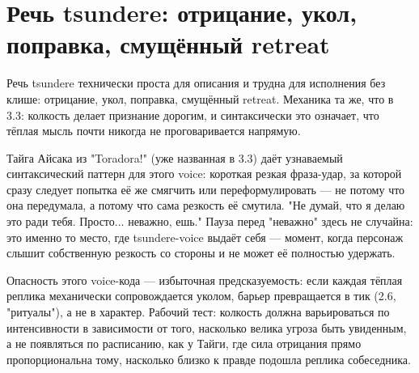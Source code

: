\section{Речь tsundere: отрицание, укол, поправка, смущённый retreat}

Речь tsundere технически проста для описания и трудна для исполнения без клише: отрицание, укол, поправка, смущённый retreat. Механика та же, что в 3.3: колкость делает признание дорогим, и синтаксически это означает, что тёплая мысль почти никогда не проговаривается напрямую.

Тайга Айсака из "Toradora!" (уже названная в 3.3) даёт узнаваемый синтаксический паттерн для этого voice: короткая резкая фраза-удар, за которой сразу следует попытка её же смягчить или переформулировать — не потому что она передумала, а потому что сама резкость её смутила. "Не думай, что я делаю это ради тебя. Просто... неважно, ешь." Пауза перед "неважно" здесь не случайна: это именно то место, где tsundere-voice выдаёт себя — момент, когда персонаж слышит собственную резкость со стороны и не может её полностью удержать.

Опасность этого voice-кода — избыточная предсказуемость: если каждая тёплая реплика механически сопровождается уколом, барьер превращается в тик (2.6, "ритуалы"), а не в характер. Рабочий тест: колкость должна варьироваться по интенсивности в зависимости от того, насколько велика угроза быть увиденным, а не появляться по расписанию, как у Тайги, где сила отрицания прямо пропорциональна тому, насколько близко к правде подошла реплика собеседника.
